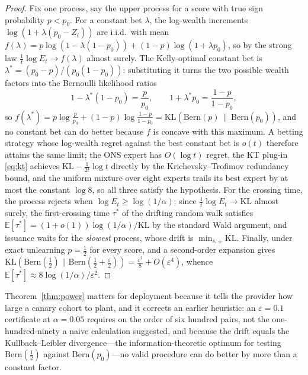 \documentclass[pdflatex,sn-mathphys-num]{sn-jnl}
\theoremstyle{thmstyleone}
\theoremstyle{thmstyletwo}
\theoremstyle{thmstylethree}
\newcommand{\KL}{\mathrm{KL}}
\newcommand{\Bern}{\mathrm{Bern}}
\newcommand{\eps}{\varepsilon}
\newcommand{\Efrak}{\mathbb{E}}
\begin{document}
\begin{proof}
Fix one process, say the upper process for a score with true sign probability
$p < p_0$. For a constant bet $\lambda$, the log-wealth increments
$\log(1 + \lambda(p_0 - Z_i))$ are i.i.d.\ with mean
$f(\lambda) = p \log(1 - \lambda(1 - p_0)) + (1-p)\log(1 + \lambda p_0)$, so by the
strong law $\tfrac1t \log E_t \to f(\lambda)$ almost surely. The Kelly-optimal
constant bet is $\lambda^\ast = (p_0 - p)/(p_0(1 - p_0))$: substituting it turns the
two possible wealth factors into the Bernoulli likelihood ratios
\[
1 - \lambda^\ast(1 - p_0) = \frac{p}{p_0}, \qquad
1 + \lambda^\ast p_0 = \frac{1 - p}{1 - p_0},
\]
so $f(\lambda^\ast) = p \log\tfrac{p}{p_0} + (1-p)\log\tfrac{1-p}{1-p_0}
= \KL(\Bern(p)\,\|\,\Bern(p_0))$, and no constant bet can do better because $f$ is
concave with this maximum. A betting strategy whose log-wealth regret against the best
constant bet is $o(t)$ therefore attains the same limit; the ONS expert has $O(\log t)$
regret, the KT plug-in \eqref{eq:kt} achieves
$\KL - \tfrac{1}{2t}\log t$ directly by the Krichevsky--Trofimov redundancy bound, and
the uniform mixture over eight experts trails its best expert by at most the constant
$\log 8$, so all three satisfy the hypothesis. For the crossing time, the process
rejects when $\log E_t \ge \log(1/\alpha)$; since $\tfrac1t\log E_t \to \KL$ almost
surely, the first-crossing time $\tau^\ast$ of the drifting random walk satisfies
$\Efrak[\tau^\ast] = (1 + o(1)) \log(1/\alpha)/\KL$ by the standard Wald argument, and
issuance waits for the \emph{slowest} process, whose drift is $\min_{s,\pm} \KL$.
Finally, under exact unlearning $p = \tfrac12$ for every score, and a second-order
expansion gives $\KL(\Bern(\tfrac12) \| \Bern(\tfrac12 + \tfrac\eps2)) =
\tfrac{\eps^2}{8} + O(\eps^4)$, whence
$\Efrak[\tau^\ast] \approx 8\log(1/\alpha)/\eps^2$.
\end{proof}

Theorem~\ref{thm:power} matters for deployment because it tells the provider how large a
canary cohort to plant, and it corrects an earlier heuristic: an $\eps = 0.1$
certificate at $\alpha = 0.05$ requires on the order of six hundred pairs, not the
one-hundred-ninety a naive calculation suggested, and because the drift equals the
Kullback--Leibler divergence---the information-theoretic optimum for testing
$\Bern(\tfrac12)$ against $\Bern(p_0)$---no valid procedure can do better by more than
a constant factor.
\end{document}
